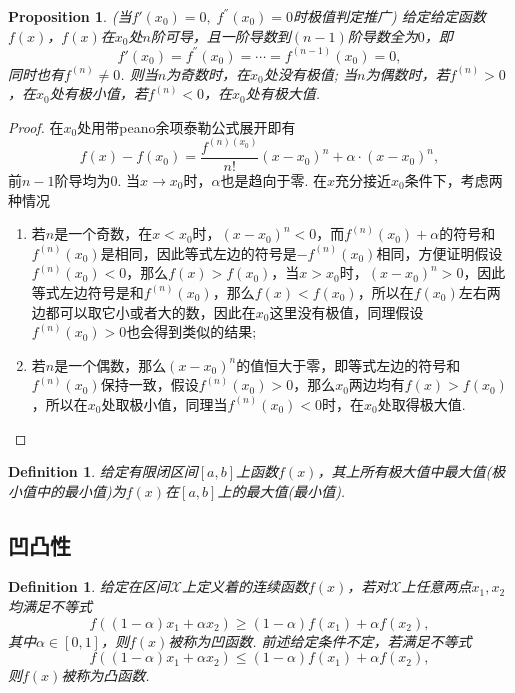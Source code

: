 \documentclass{article}
\newtheorem{proposition}[theorem]{Proposition}
\newtheorem{definition}[theorem]{Definition}
\begin{document}
\begin{proposition}
\rm {\color{red} (当$f'(x_0) = 0,\; f^{''}(x_0) = 0$时极值判定推广)} 给定给定函数$f(x)$，$f(x)$在$x_0$处$n$阶可导，且一阶导数到$(n-1)$阶导数全为$0$，即
$$
f'(x_0) = f^{''}(x_0) = \cdots = f^{(n-1)}(x_0) = 0,
$$
同时也有$f^{(n)} \neq 0$. 则当$n$为奇数时，在$x_0$处没有极值; 当$n$为偶数时，若$f^{(n)} > 0$，在$x_0$处有极小值，若$f^{(n)} < 0$，在$x_0$处有极大值.
\end{proposition}

\begin{proof}
在$x_0$处用带peano余项泰勒公式展开即有
$$
f(x) - f(x_0) = \frac{f^{(n)(x_0)}}{n!}(x-x_0)^n + \alpha\cdot( x-x_0)^n,
$$
前$n-1$阶导均为0. 当$x \rightarrow x_0$时，$\alpha$也是趋向于零. 在$x$充分接近$x_0$条件下，考虑两种情况
\begin{enumerate}
\item 若$n$是一个奇数，在$x < x_0$时，$(x-x_0)^n < 0$，而$f^{(n)}(x_0)+\alpha$的符号和$f^{(n)}(x_0)$是相同，因此等式左边的符号是$-f^{(n)}(x_0)$相同，方便证明假设$f^{(n)}(x_0) < 0$，那么$f(x) > f(x_0)$，当$x > x_0$时，$(x-x_0)^n > 0$，因此等式左边符号是和$f^{(n)}(x_0)$，那么$f(x) < f(x_0)$，所以在$f(x_0)$左右两边都可以取它小或者大的数，因此在$x_0$这里没有极值，同理假设$f^{(n)}(x_0) > 0$也会得到类似的结果;

\item 若$n$是一个偶数，那么$(x-x_0)^n$的值恒大于零，即等式左边的符号和$f^{(n)}(x_0)$保持一致，假设$f^{(n)}(x_0) > 0$，那么$x_0$两边均有$f(x) > f(x_0)$，所以在$x_0$处取极小值，同理当$f^{(n)}(x_0) < 0$时，在$x_0$处取得极大值.
\end{enumerate}
\end{proof}

\begin{definition}
\rm 给定有限闭区间$[a,b]$上函数$f(x)$，其上所有极大值中最大值(极小值中的最小值)为$f(x)$在$[a,b]$上的{\color{red}最大值(最小值)}.
\end{definition}

\subsection{凹凸性}

\begin{definition}
\rm 给定在区间$\mathcal{X}$上定义着的连续函数$f(x)$，若对$\mathcal{X}$上任意两点$x_1,x_2$均满足不等式
$$
f((1-\alpha)x_1 + \alpha x_2) \geq (1-\alpha)f(x_1) + \alpha f(x_2),
$$
其中$\alpha \in [0,1]$，则$f(x)$被称为{\color{red}凹函数}. 前述给定条件不定，若满足不等式
$$
f((1-\alpha)x_1 + \alpha x_2) \leq (1-\alpha)f(x_1) + \alpha f(x_2),
$$
则$f(x)$被称为{\color{red}凸函数}.
\end{definition}
\end{document}
